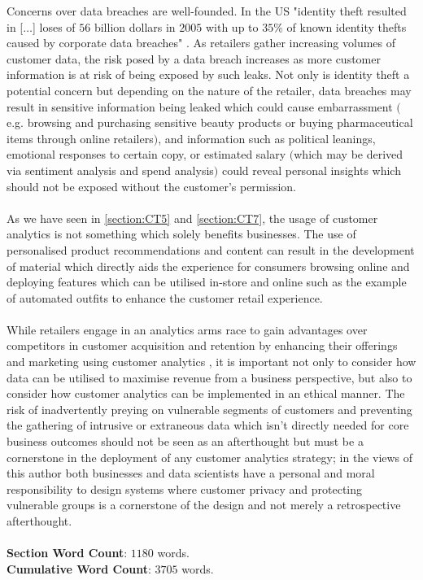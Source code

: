 \documentclass[11pt]{article}
\theoremstyle{plain}
\theoremstyle{definition}
\begin{document}
Concerns over data breaches are well-founded. In the US "identity theft resulted in  [$\dots$] loses of $56$ billion dollars in $2005$ with up to $35$\% of known identity thefts caused by corporate data breaches" \cite{Romanosky:2011aa}. As retailers gather increasing volumes of customer data, the risk posed by a data breach increases as more customer information is at risk of being exposed by such leaks. Not only is identity theft a potential concern but depending on the nature of the retailer, data breaches may result in sensitive information being leaked which could cause embarrassment $($e.g. browsing and purchasing sensitive beauty products or buying pharmaceutical items through online retailers$)$, and information such as political leanings, emotional responses to certain copy, or estimated salary $($which may be derived via sentiment analysis and spend analysis$)$ could reveal personal insights which should not be exposed without the customer's permission.\\
\\
As we have seen in \ref{section:CT5} and \ref{section:CT7}, the usage of customer analytics is not something which solely benefits businesses. The use of personalised product recommendations and content can result in the development of material which directly aids the experience for consumers browsing online \cite{10.2307/41409964} and deploying features which can be utilised in-store and online such as the example of automated outfits \cite{DBLP:journals/corr/abs-1904-00741} to enhance the customer retail experience. \\
\\
While retailers engage in an analytics arms race to gain advantages over competitors in customer acquisition and retention by enhancing their offerings and marketing using customer analytics \cite{https://doi.org/10.1002/pa.1944}, it is important not only to consider how data can be utilised to maximise revenue from a business perspective, but also to consider how customer analytics can be implemented in an ethical manner. The risk of inadvertently preying on vulnerable segments of customers and preventing the gathering of intrusive or extraneous data which isn't directly needed for core business outcomes should not be seen as an afterthought but must be a cornerstone in the deployment of any customer analytics strategy; in the views of this author both businesses and data scientists have a personal and moral responsibility to design systems where customer privacy and protecting vulnerable groups is a cornerstone of the design and not merely a retrospective afterthought. \\
\\
\textbf{Section Word Count}: $1180$ words.\\
\textbf{Cumulative Word Count}: $3705$ words.

\pagebreak


\end{document}
